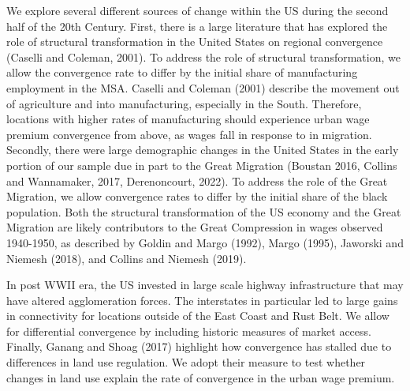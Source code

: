 \documentclass[12pt,twoside]{article}
\begin{document}
We explore several different sources of change within the US during the second half of the 20th Century. 
First, there is a large literature that has explored the role of structural transformation in the United States on regional convergence (Caselli and Coleman, 2001). 
To address the role of structural transformation, we allow the convergence rate to differ by the initial share of manufacturing employment in the MSA. 
Caselli and Coleman (2001) describe the movement out of agriculture and into manufacturing, especially in the South. 
Therefore, locations with higher rates of manufacturing should experience urban wage premium convergence from above, as wages fall in response to in migration. 
Secondly, there were large demographic changes in the United States in the early portion of our sample due in part to the Great Migration (Boustan 2016, Collins and Wannamaker, 2017, Derenoncourt, 2022).
To address the role of the Great Migration, we allow convergence rates to differ by the initial share of the black population. 
Both the structural transformation of the US economy and the Great Migration are likely contributors to the Great Compression in wages observed 1940-1950, as described by Goldin and Margo (1992), Margo (1995), Jaworski and Niemesh (2018), and Collins and Niemesh (2019). 

In post WWII era, the US invested in large scale highway infrastructure that may have altered agglomeration forces. 
The interstates in particular led to large gains in connectivity for locations outside of the East Coast and Rust Belt. 
We allow for differential convergence by including historic measures of market access.  
Finally,  Ganang and Shoag (2017) highlight how convergence has stalled due to differences in land use regulation.
We adopt their measure to test whether changes in land use explain the rate of convergence in the urban wage premium. 



\newpage 
{\small  }
\end{document}

